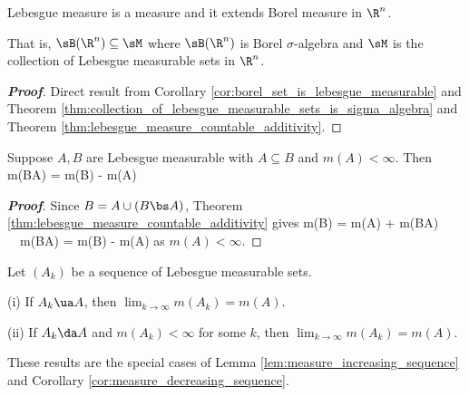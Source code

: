 \begin{corollary}\label{cor:lebesgue_measure_is_measure_extends_borel_measure_in_real_n}
Lebesgue measure is a measure and it extends Borel measure in $\R^n$.

That is, $\sB(\R^n)\subseteq \sM$ where $\sB(\R^n)$ is Borel $\sigma$-algebra and $\sM$ is the collection of Lebesgue measurable sets in $\R^n$.
\end{corollary}

\begin{proof}[\bf Proof]
Direct result from Corollary \ref{cor:borel_set_is_lebesgue_measurable} and Theorem \ref{thm:collection_of_lebesgue_measurable_sets_is_sigma_algebra} and Theorem \ref{thm:lebesgue_measure_countable_additivity}.
\end{proof}


\begin{corollary}\label{cor:difference_increasing_lebesgue_measurable_sets}
Suppose $A,B$ are Lebesgue measurable with $A\subseteq B$ and $m(A)<\infty$. Then
\be
m(B\bs A) = m(B) - m(A)
\ee
\end{corollary}

\begin{proof}[\bf Proof]
Since $B = A\cup (B\bs A)$, Theorem \ref{thm:lebesgue_measure_countable_additivity} gives
\be
m(B) = m(A) + m(B\bs A) \ \ra\ m(B\bs A) = m(B) - m(A)
\ee
as $m(A)<\infty$.
\end{proof}


\begin{theorem}\label{thm:limit_of_sequence_of_lebesgue_measurable_sets}
Let $(A_k)$ be a sequence of Lebesgue measurable sets.
\ben
\item [(i)] If $A_k\ua A$, then $\lim_{k\to \infty} m(A_k) = m(A)$.
\item [(ii)] If $A_k\da A$ and $m(A_k) <\infty$ for some $k$, then $\lim_{k\to \infty} m(A_k) = m(A)$.
\een
\end{theorem}

\begin{remark}
These results are the special cases of Lemma \ref{lem:measure_increasing_sequence} and Corollary \ref{cor:measure_decreasing_sequence}.
\end{remark}

